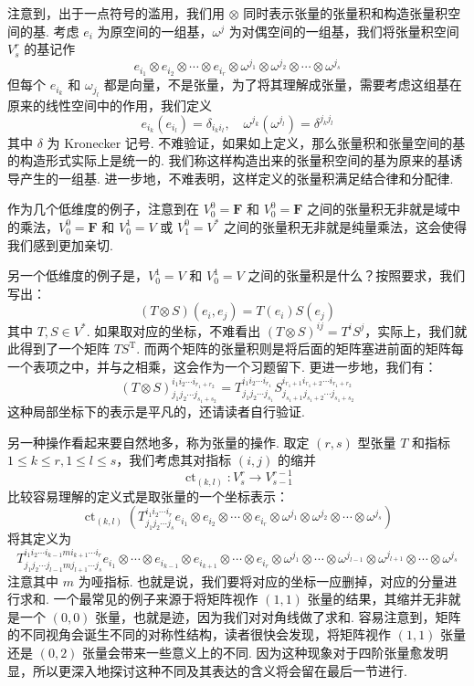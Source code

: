 注意到，出于一点符号的滥用，我们用 $\otimes$ 同时表示张量的张量积和构造张量积空间的基. 考虑 ${e_i}$ 为原空间的一组基，${\omega^j}$ 为对偶空间的一组基，我们将张量积空间 $V^r_s$ 的基记作
\[
e_{i_1} \otimes e_{i_2} \otimes \cdots \otimes e_{i_r} \otimes \omega^{j_1} \otimes \omega^{j_2} \otimes \cdots \otimes \omega^{j_s}
\]
但每个 $e_{i_k}$ 和 $\omega_{j_l}$ 都是向量，不是张量，为了将其理解成张量，需要考虑这组基在原来的线性空间中的作用，我们定义
\[
e_{i_k} (e_{i_l}) = \delta_{i_k i_l}, \quad \omega^{j_k} (\omega^{j_l}) = \delta^{j_k j_l}
\]
其中 $\delta$ 为 Kronecker 记号. 不难验证，如果如上定义，那么张量积和张量空间的基的构造形式实际上是统一的. 我们称这样构造出来的张量积空间的基为原来的基诱导产生的一组基. 进一步地，不难表明，这样定义的张量积满足结合律和分配律.

作为几个低维度的例子，注意到在 $V_0^0 = \mathbf{F}$ 和 $V_0^0 = \mathbf{F}$ 之间的张量积无非就是域中的乘法，$V_0^0 = \mathbf{F}$ 和 $V_0^1 = V$ 或 $V_1^0 = V^*$ 之间的张量积无非就是纯量乘法，这会使得我们感到更加亲切.

另一个低维度的例子是，$V_0^1 = V$ 和 $V_0^1 = V$ 之间的张量积是什么？按照要求，我们写出：
\[
(T \otimes S)(e_{i}, e_{j}) = T (e_i) S (e_j)
\]
其中 $T, S \in V^*$. 如果取对应的坐标，不难看出 $(T \otimes S)^{i j} = T^i S^j$，实际上，我们就此得到了一个矩阵 $T S^\mathrm{T}$. 而两个矩阵的张量积则是将后面的矩阵塞进前面的矩阵每一个表项之中，并与之相乘，这会作为一个习题留下. 更进一步地，我们有：
\[
(T \otimes S)^{i_1 i_2 \cdots i_{r_1 + r_2}}_{j_1 j_2 \cdots j_{s_1 + s_2}} = T^{i_1 i_2 \cdots i_{r_1}}_{j_1 j_2 \cdots j_{s_1}} S^{i_{r_1 + 1} i_{r_1 + 2} \cdots i_{r_1 + r_2}}_{j_{s_1 + 1} j_{s_1 + 2} \cdots j_{s_1 + s_2}}
\]
这种局部坐标下的表示是平凡的，还请读者自行验证.

另一种操作看起来要自然地多，称为张量的操作. 取定 $(r, s)$ 型张量 $T$ 和指标 $1 \leqslant k \leqslant r, 1 \leqslant l \leqslant s$，我们考虑其对指标 $(i, j)$ 的缩并
\[
\mathop{\mathrm{ct}}_{(k, l)} : V^r_s \to V^{r - 1}_{s - 1}
\]
比较容易理解的定义式是取张量的一个坐标表示：
\[
\mathop{\mathrm{ct}}_{(k, l)} (T_{j_1 j_2 \cdots j_s}^{i_1 i_2 \cdots i_r} e_{i_1} \otimes e_{i_2} \otimes \cdots \otimes e_{i_r} \otimes \omega^{j_1} \otimes \omega^{j_2} \otimes \cdots \otimes \omega^{j_s})
\]
将其定义为
\[
T_{j_1 j_2 \cdots j_{l - 1} m j_{l + 1} \cdots j_{s}}^{i_1 i_2 \cdots i_{k - 1} m i_{k + 1} \cdots i_r} e_{i_1} \otimes \cdots \otimes e_{i_{k - 1}} \otimes e_{i_{k + 1}} \otimes \cdots \otimes e_{i_r} \otimes \omega^{j_1} \otimes \cdots \otimes \omega^{j_{l - 1}} \otimes \omega^{j_{l + 1}} \otimes \cdots \otimes \omega^{j_s}
\]
注意其中 $m$ 为哑指标. 也就是说，我们要将对应的坐标一应删掉，对应的分量进行求和. 一个最常见的例子来源于将矩阵视作 $(1, 1)$ 张量的结果，其缩并无非就是一个 $(0, 0)$ 张量，也就是迹，因为我们对对角线做了求和. 容易注意到，矩阵的不同视角会诞生不同的对称性结构，读者很快会发现，将矩阵视作 $(1, 1)$ 张量还是 $(0, 2)$ 张量会带来一些意义上的不同. 因为这种现象对于四阶张量愈发明显，所以更深入地探讨这种不同及其表达的含义将会留在最后一节进行.

